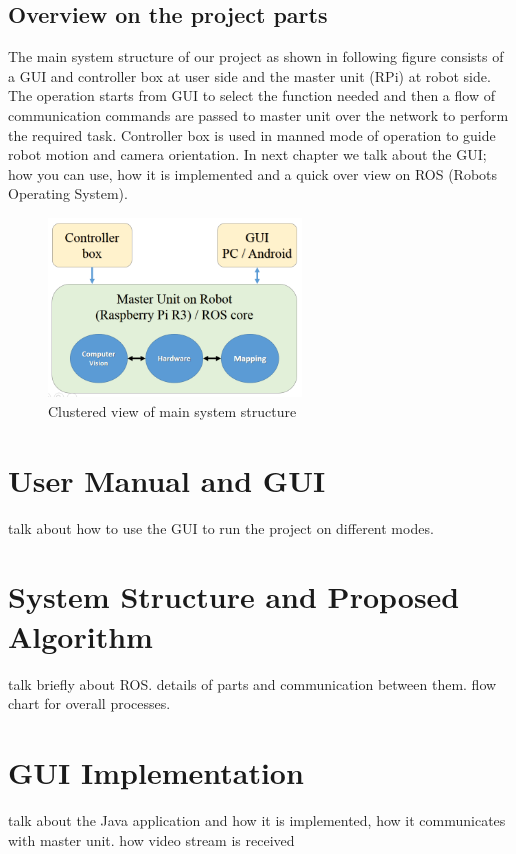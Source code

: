 \documentclass[12pt]{article}
\begin{document}
\subsection{Overview on the project parts}
The main system structure of our project as shown in following figure consists of a GUI and controller box at user side and the master unit (RPi) at robot side. The operation starts from GUI to select the function needed and then a flow of communication commands are passed to master unit over the network to perform the required task. Controller box is used in manned mode of operation to guide robot motion and camera orientation. In next chapter we talk about the GUI; how you can use, how it is implemented and a quick over view on ROS (Robots Operating System).
\begin{figure}[H]
	\centering
	\includegraphics[width =0.6\textwidth]{Fig/overview.png}
	\caption{Clustered view of main system structure}
	
\end{figure}
\newpage

\section{User Manual and GUI}
talk about how to use the GUI to run the project on different modes.

\section{System Structure and Proposed Algorithm}
talk briefly about ROS. details of parts and communication between them. flow chart for overall processes.

\section{GUI Implementation}
talk about the Java application and how it is implemented, how it communicates with master unit. how video stream is received
\end{document}
